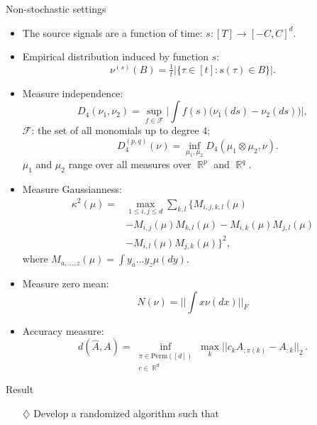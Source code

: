 \documentclass[final]{beamer} %
\DeclareMathOperator{\real}{\mathbb{R}}
\begin{document}
\begin{frame}[c]
\begin{columns}[t,totalwidth=\textwidth]
	\begin{column}{.32\textwidth}%
		\begin{block}{Non-stochastic settings}
			\begin{itemize}
				\item The source signals are a function of time: $s:[T] \to [-C,C]^d$.
				\item Empirical distribution induced by function $s$:
				\[
					\nu^{(s)}(B)=\tfrac{1}{t}|\{\tau \in [t]: s(\tau) \in B\}|.
				\]
				\item Measure independence:
					\[
					D_4(\nu_1,\nu_2)	= \sup_{f\in\mathcal{F}} \big|\int f(s) \big(\nu_1(ds) -\nu_2(ds)\big) \big|,
					\]
				 $\mathcal{F}$: the set of all monomials up to degree $4$; 
				  \[ \quad D_4^{(p,q)} (\nu)= \inf_{\mu_1,\mu_2} D_4(\mu_1\otimes \mu_2,\nu).
				  \]
				  $\mu_1$ and $\mu_2$ range over all measures over $\real^p$ and $\real^q$.
				\item Measure Gaussianness:
					\begin{align*}
							\kappa^2(\mu)  = &  \max_{1\le i,j\le d} \sum_{k,l} 
							\big\{ 
							M_{i,j,k,l}(\mu) \\
							& - M_{i,j}(\mu) M_{k,l}(\mu) -  M_{i,k}(\mu) M_{j,l}(\mu) \\
							& - M_{i,l}(\mu) M_{j,k}(\mu)\big\}^2,
					\end{align*}
					where $M_{a,\dots,z}(\mu) = \int y_a \dots y_z \mu(dy)$.
				\item Measure zero mean:
					\[
				 	N(\nu) = ||\int x \nu(dx) ||_F
					\]
				\item Accuracy measure:
					\[
					d(\hat{A},A) = \inf_{
						 \substack{\pi \in \mathrm{Perm}([d])\\
						 c\in \real^d}} \max_{k} 
						|| c_k A_{:\pi(k)} - A_{:k} ||_2\,.
					\]
			\end{itemize}
		\end{block}
		\vspace{0.5ex}
		\begin{block}{Result}
				\begin{tcolorbox}[title = \vspace{0.4cm}\textbf{\large Our Contributions} \vspace{0.4cm}, title filled, width = 0.93\textwidth, colback = uofagreen!10, colframe = red]
						\begin{itemize}
						\vspace{0.5cm}
						\item[$\diamondsuit$] Develop a randomized algorithm such that 

\end{itemize}
\end{tcolorbox}
\end{block}
\end{column}
\end{columns}
\end{frame}
\end{document}
